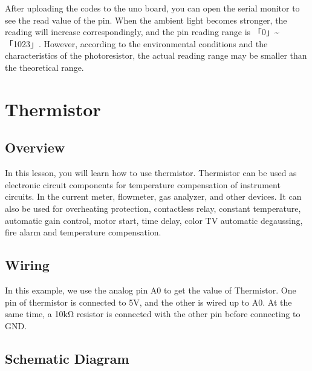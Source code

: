 \documentclass[a4paper,11pt,english]{sphinxmanual}
\begin{document}
\sphinxAtStartPar
After uploading the codes to the uno board, you can open the serial monitor to see the read value of the pin. When the ambient light becomes stronger, the reading will increase correspondingly, and the pin reading range is 「0」\textasciitilde{}「1023」.  However, according to the environmental conditions and the characteristics of the photoresistor, the actual reading range may be smaller than the theoretical range.

\sphinxstepscope


\section{Thermistor}
\label{\detokenize{Basic_Project/Thermistor:thermistor}}\label{\detokenize{Basic_Project/Thermistor:basic-thermistor}}\label{\detokenize{Basic_Project/Thermistor::doc}}

\subsection{Overview}
\label{\detokenize{Basic_Project/Thermistor:overview}}
\sphinxAtStartPar
In this lesson, you will learn how to use thermistor. Thermistor can be used as electronic circuit components for temperature compensation of instrument circuits. In the current meter, flowmeter, gas analyzer, and other devices. It can also be used for overheating protection, contactless relay, constant temperature, automatic gain control, motor start, time delay, color TV automatic degaussing, fire alarm and temperature compensation.


\subsection{Wiring}
\label{\detokenize{Basic_Project/Thermistor:wiring}}
\sphinxAtStartPar
In this example, we use the analog pin A0 to get the value of Thermistor. One pin of thermistor is connected to 5V, and the other is wired up to A0. At the same time, a 10kΩ resistor is connected with the other pin before connecting to GND.



\subsection{Schematic Diagram}
\label{\detokenize{Basic_Project/Thermistor:schematic-diagram}}
\end{document}
